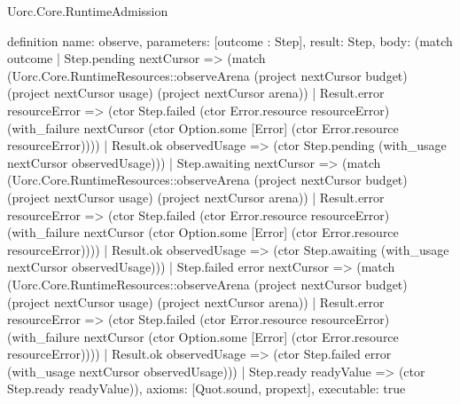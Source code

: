 \begin{lexlean}{Uorc.Core.RuntimeAdmission}
\begin{semanticmodule}
definition{
  name: observe,
  parameters: [outcome : Step],
  result: Step,
  body: (match outcome
    | Step.pending nextCursor => (match (Uorc.Core.RuntimeResources::observeArena (project nextCursor budget) (project nextCursor usage) (project nextCursor arena))
      | Result.error resourceError => (ctor Step.failed (ctor Error.resource resourceError) (with_failure nextCursor (ctor Option.some [Error] (ctor Error.resource resourceError))))
      | Result.ok observedUsage => (ctor Step.pending (with_usage nextCursor observedUsage)))
    | Step.awaiting nextCursor => (match (Uorc.Core.RuntimeResources::observeArena (project nextCursor budget) (project nextCursor usage) (project nextCursor arena))
      | Result.error resourceError => (ctor Step.failed (ctor Error.resource resourceError) (with_failure nextCursor (ctor Option.some [Error] (ctor Error.resource resourceError))))
      | Result.ok observedUsage => (ctor Step.awaiting (with_usage nextCursor observedUsage)))
    | Step.failed error nextCursor => (match (Uorc.Core.RuntimeResources::observeArena (project nextCursor budget) (project nextCursor usage) (project nextCursor arena))
      | Result.error resourceError => (ctor Step.failed (ctor Error.resource resourceError) (with_failure nextCursor (ctor Option.some [Error] (ctor Error.resource resourceError))))
      | Result.ok observedUsage => (ctor Step.failed error (with_usage nextCursor observedUsage)))
    | Step.ready readyValue => (ctor Step.ready readyValue)),
  axioms: [Quot.sound, propext],
  executable: true
}


\end{semanticmodule}
\end{lexlean}
